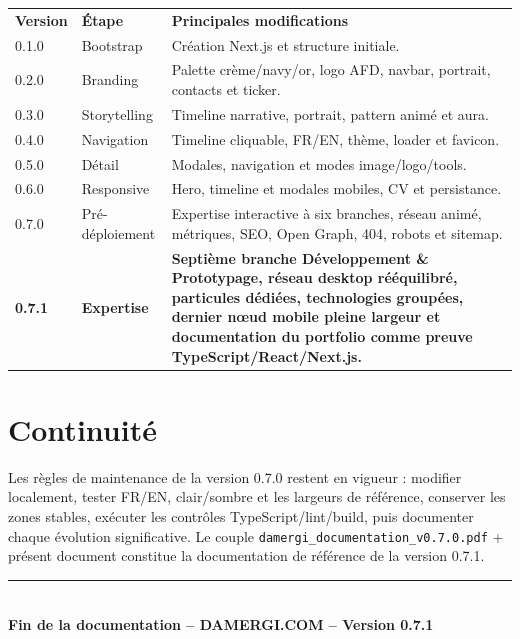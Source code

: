 \documentclass[11pt,a4paper]{article}
\newcommand{\tech}[1]{\texttt{#1}}
\newcommand{\version}{0.7.1}
\begin{document}
\begin{tabularx}{\textwidth}{p{}p{}X}
  \textbf{Version} & \textbf{Étape} & \textbf{Principales modifications} \\
  0.1.0 & Bootstrap & Création Next.js et structure initiale. \\
  0.2.0 & Branding & Palette crème/navy/or, logo AFD, navbar, portrait, contacts et ticker. \\
  0.3.0 & Storytelling & Timeline narrative, portrait, pattern animé et aura. \\
  0.4.0 & Navigation & Timeline cliquable, FR/EN, thème, loader et favicon. \\
  0.5.0 & Détail & Modales, navigation et modes image/logo/tools. \\
  0.6.0 & Responsive & Hero, timeline et modales mobiles, CV et persistance. \\
  0.7.0 & Pré-déploiement & Expertise interactive à six branches, réseau animé, métriques, SEO, Open Graph, 404, robots et sitemap. \\
  \textbf{0.7.1} & \textbf{Expertise} & \textbf{Septième branche Développement \& Prototypage, réseau desktop rééquilibré, particules dédiées, technologies groupées, dernier nœud mobile pleine largeur et documentation du portfolio comme preuve TypeScript/React/Next.js.} \\
\end{tabularx}

\section{Continuité}

Les règles de maintenance de la version 0.7.0 restent en vigueur : modifier localement, tester
FR/EN, clair/sombre et les largeurs de référence, conserver les zones stables, exécuter les
contrôles TypeScript/lint/build, puis documenter chaque évolution significative. Le couple
\tech{damergi\_documentation\_v0.7.0.pdf} + présent document constitue la documentation de
référence de la version 0.7.1.

\vfill
\begin{center}
  {\color{damergigold}\rule{0.55\textwidth}{0.6pt}}\\[0.8em]
  \textbf{Fin de la documentation -- DAMERGI.COM -- Version \version}
\end{center}
\end{document}
